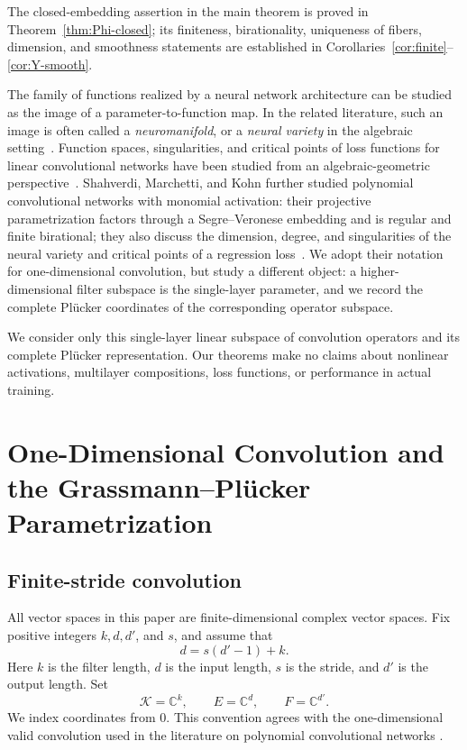 \documentclass{siamonline250211}
\newcommand{\CC}{\mathbb C}
\newcommand{\cK}{\mathcal K}
\begin{document}
The closed-embedding assertion in the main theorem is proved in
Theorem~\ref{thm:Phi-closed}; its finiteness, birationality, uniqueness of
fibers, dimension, and smoothness statements are established in
Corollaries~\ref{cor:finite}--\ref{cor:Y-smooth}.



The family of functions realized by a neural network architecture can be studied
as the image of a parameter-to-function map. In the related literature, such an
image is often called a \emph{neuromanifold}, or a \emph{neural variety} in the
algebraic setting~\cite{APO06,KMMT22,SMK25}. Function spaces, singularities, and
critical points of loss functions for linear convolutional networks have been
studied from an algebraic-geometric perspective~\cite{KMMT22,KMST24}.
Shahverdi, Marchetti, and Kohn further studied polynomial convolutional networks
with monomial activation: their projective parametrization factors through a
Segre--Veronese embedding and is regular and finite birational; they also discuss
the dimension, degree, and singularities of the neural variety and critical
points of a regression loss~\cite[Secs.~3.1, 4.1, and 4.2]{SMK25}. We adopt their
notation for one-dimensional convolution, but study a different object: a
higher-dimensional filter subspace is the single-layer parameter, and we record
the complete Pl\"ucker coordinates of the corresponding operator subspace.

We consider only this single-layer linear subspace of convolution operators and
its complete Pl\"ucker representation. Our theorems make no claims about nonlinear
activations, multilayer compositions, loss functions, or performance in actual
training.

\section{One-Dimensional Convolution and the Grassmann--Pl\texorpdfstring{\"u}{u}cker Parametrization}

\subsection{Finite-stride convolution}

All vector spaces in this paper are finite-dimensional complex vector spaces.
Fix positive integers $k,d,d'$, and $s$, and assume that
\begin{equation}\label{eq:length-relation}
  d=s(d'-1)+k.
\end{equation}
Here $k$ is the filter length, $d$ is the input length, $s$ is the stride, and
$d'$ is the output length. Set
\[
  \cK=\CC^k,\qquad E=\CC^d,\qquad F=\CC^{d'}.
\]
We index coordinates from $0$. This convention agrees with the one-dimensional
valid convolution used in the literature on polynomial convolutional networks
\cite[Sec.~3.1, Eq.~(1)]{SMK25}.
\end{document}
